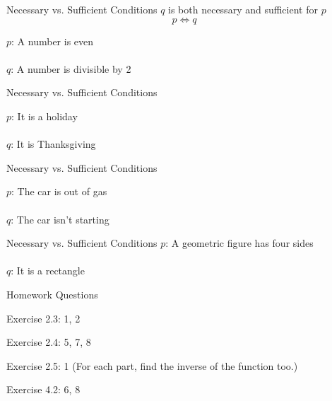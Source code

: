 \documentclass{./../../Latex/teaching_slides}
\begin{document}
\begin{frame}{Necessary vs. Sufficient Conditions}
$q$ is both necessary and sufficient for $p$
$$ p \iff q $$ 
\vspace{1em}

\pause
$p$:  A number is even \\~\\
$q$:  A number is divisible by 2
\end{frame}

\begin{frame}{Necessary vs. Sufficient Conditions}
\vspace{1em}


$p$:  It is a holiday  \\~\\
$q$:  It is Thanksgiving
\end{frame}

\begin{frame}{Necessary vs. Sufficient Conditions}
\vspace{1em}


$p$: The car is out of gas  \\~\\
$q$: The car isn't starting
\end{frame}

\begin{frame}{Necessary vs. Sufficient Conditions}
\vspace{1em}
$p$:  A geometric figure has four sides  \\~\\
$q$:  It is a rectangle
\end{frame}

\begin{frame}{Homework Questions}
\begin{witemize}
  \item Exercise 2.3: 1, 2
  \item Exercise 2.4: 5, 7, 8
  \item Exercise 2.5: 1 (For each part, find the inverse of the function too.)
  \item Exercise 4.2: 6, 8
\end{witemize}

\end{frame}
\end{document}
